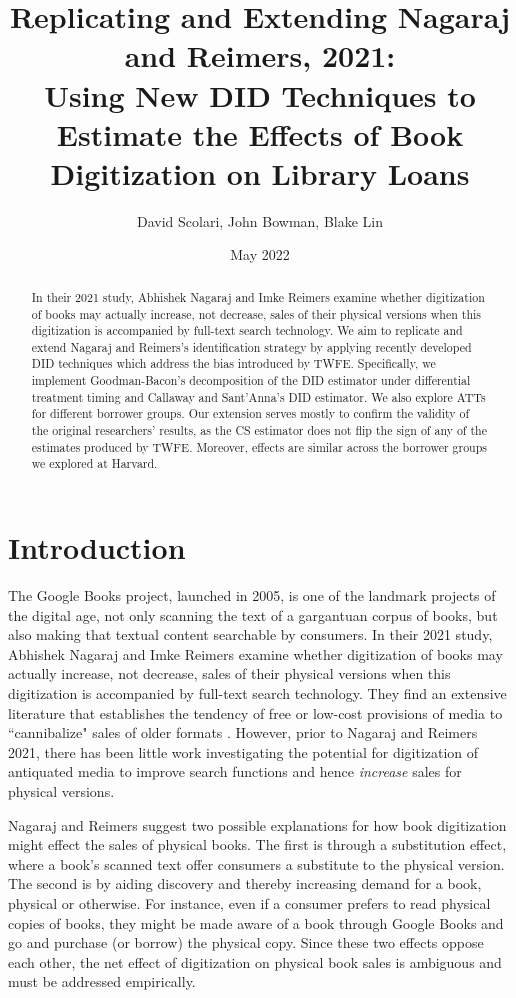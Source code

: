\documentclass{article}
\author{David Scolari, John Bowman, Blake Lin}
\title{Replicating and Extending Nagaraj and Reimers, 2021: \\
Using New DID Techniques to Estimate the Effects of Book Digitization on Library Loans}
\date{May 2022}
\begin{document}
\maketitle

\begin{abstract}
In their 2021 study, Abhishek Nagaraj and Imke Reimers examine whether digitization of books may actually increase, not decrease, sales of their physical versions when this digitization is accompanied by full-text search technology. We aim to replicate and extend Nagaraj and Reimers’s identification strategy by applying recently developed DID techniques which address the bias introduced by TWFE. Specifically, we implement Goodman-Bacon’s decomposition of the DID estimator under differential treatment timing and Callaway and Sant’Anna’s DID estimator. We also explore ATTs for different borrower groups. Our extension serves mostly to confirm the validity of the original researchers’ results, as the CS estimator does not flip the sign of any of the estimates produced by TWFE. Moreover, effects are similar across the borrower groups  we explored at Harvard.
\end{abstract}

\section{Introduction}
The Google Books project, launched in 2005, is one of the landmark projects of the digital age, not only scanning the text of a gargantuan corpus of books, but also making that textual content searchable by consumers. In their 2021 study, Abhishek Nagaraj and Imke Reimers examine whether digitization of books may actually increase, not decrease, sales of their physical versions when this digitization is accompanied by full-text search technology. They find an extensive literature that establishes the tendency of free or low-cost provisions of media to ``cannibalize" sales of older formats \cite{nagaraj2021digitization}. However, prior to Nagaraj and Reimers 2021, there has been little work investigating the potential for digitization of antiquated media to improve search functions and hence \textit{increase} sales for physical versions. 

Nagaraj and Reimers  suggest two possible explanations for how book digitization might effect the sales of physical books. The first is through a substitution effect, where a book's scanned text offer consumers a substitute to the physical version. The second is by aiding discovery and thereby increasing demand for a book, physical or otherwise. For instance, even if a consumer prefers to read physical copies of books, they might be made aware of a book through Google Books and go and purchase (or borrow) the physical copy. Since these two effects oppose each other, the net effect of digitization on physical book sales is ambiguous and must be addressed empirically.
\end{document}

